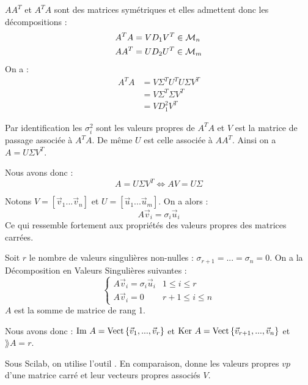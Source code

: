 		\begin{preuve}
			$AA^T$ et $A^T A$ sont des matrices symétriques et elles admettent donc les décompositions :
			\begin{align*}
				A^T A &= VD_1V^T \in \mathcal{M}_n \\
				A A^T &= UD_2U^T \in \mathcal{M}_m
			\end{align*}
			On a :
			\begin{align*}
				A^T A
					&= V \Sigma^T U^T U \Sigma V^T 	\\
					&= V \Sigma^T \Sigma V^T		\\
					&= V D_1^2 V^T
			\end{align*}

			Par identification les $\sigma_i^2$ sont les valeurs propres de $A^T A$ et $V$ est la matrice de passage associée à $A^T A$.
			De même $U$ est celle associée à $A A^T$.
			Ainsi on a $A = U\Sigma V^T$.
		\end{preuve}

		Nous avons donc :
		\begin{equation}
			\label{eq-4-SVD}
			A = U\Sigma V^T \iff AV = U\Sigma
		\end{equation}

		Notons $V=[\vec v_1 ... \vec v_n]$ et $U=[\vec u_1 ... \vec u_m]$.
		On a alors :
		\begin{equation}
			\label{eq-4-vpSVD}
			A \vec v_i = \sigma_i \vec u_i
		\end{equation}
		Ce qui ressemble fortement aux propriétés des valeurs propres des matrices carrées. 

		Soit $r$ le nombre de valeurs singulières non-nulles : $\sigma_{r+1} = ... = \sigma_n = 0$.
		On a la Décomposition en Valeurs Singulières suivantes :
		\begin{equation}
			\label{eq-4-decompoSVD}
				\begin{cases}
					A \vec v_i = \sigma_i \vec u_i		& 1 \leq i \leq r	\\
					A \vec v_i = 0						& r+1 \leq i \leq n
				\end{cases}
		\end{equation}
		$A$ est la somme de matrice de rang 1.

		Nous avons donc : $\text{Im~} A = \text{Vect}\,\{\vec v_1, ..., \vec v_r\}$ et $\text{Ker~} A = \text{Vect}\,\{\vec v_{r+1}, ..., \vec v_n\}$ et $\rang A = r$.

		Sous Scilab, on utilise l'outil . En comparaison,  donne les valeurs propres $vp$ d'une matrice carré et leur vecteurs propres associés $V$.

